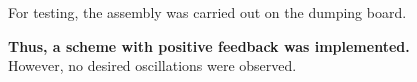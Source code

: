 For testing, the assembly was carried out on the dumping board.
\begin{center}
\end{center}

\hspace{-3mm}
\textbf{Thus, a scheme with positive feedback was implemented.} \\

\hspace{-3mm}
However, no desired oscillations were observed.